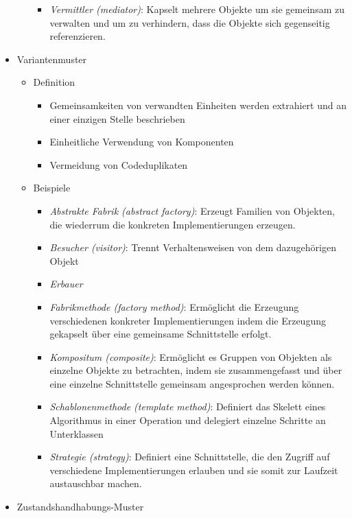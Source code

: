 \documentclass{article}
\begin{document}
\begin{itemize}
\begin{itemize}
\begin{itemize}
      \item \textit{Vermittler (mediator)}: Kapselt mehrere Objekte um sie gemeinsam zu verwalten und um zu verhindern, dass die Objekte sich gegenseitig referenzieren.
    \end{itemize}
  \end{itemize}
  \item Variantenmuster
  \begin{itemize}
    \item Definition
    \begin{itemize}
      \item Gemeinsamkeiten von verwandten Einheiten werden extrahiert und an einer einzigen Stelle beschrieben
      \item Einheitliche Verwendung von Komponenten
      \item Vermeidung von Codeduplikaten
    \end{itemize}
    \item Beispiele
    \begin{itemize}
      \item \textit{Abstrakte Fabrik (abstract factory)}: Erzeugt Familien von Objekten, die wiederrum die konkreten Implementierungen erzeugen.
      \item \textit{Besucher (visitor)}: Trennt Verhaltensweisen von dem dazugehörigen Objekt 
      \item \textit{Erbauer}
      \item \textit{Fabrikmethode (factory method)}: Ermöglicht die Erzeugung verschiedenen konkreter Implementierungen indem die Erzeugung gekapselt über eine gemeinsame Schnittstelle erfolgt. 
      \item \textit{Kompositum (composite)}: Ermöglicht es Gruppen von Objekten als einzelne Objekte zu betrachten, indem sie zusammengefasst und über eine einzelne Schnittstelle gemeinsam angesprochen werden können.
      \item \textit{Schablonenmethode (template method)}: Definiert das Skelett eines Algorithmus in einer Operation und delegiert einzelne Schritte an Unterklassen
      \item \textit{Strategie (strategy)}: Definiert eine Schnittstelle, die den Zugriff auf verschiedene Implementierungen erlauben und sie somit zur Laufzeit austauschbar machen.
    \end{itemize}
  \end{itemize}
  \item Zustandshandhabungs-Muster
  \begin{itemize}

\end{itemize}
\end{itemize}
\end{document}
